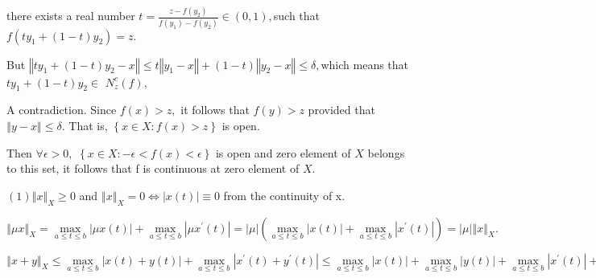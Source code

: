 \documentclass{article}
\begin{document}
there exists a real number $t=\frac{z-f\left( y_{2}\right) }{f\left(
y_{1}\right) -f\left( y_{2}\right) }\in \left( 0,1\right) ,$such that $%
f\left( ty_{1}+\left( 1-t\right) y_{2}\right) =z.$

But $\left\Vert ty_{1}+\left( 1-t\right) y_{2}-x\right\Vert \leq t\left\Vert
y_{1}-x\right\Vert +\left( 1-t\right) \left\Vert y_{2}-x\right\Vert \leq
\delta ,$which means that $ty_{1}+\left( 1-t\right) y_{2}\in $ $%
N_{z}^{c}\left( f\right) ,$

A contradiction. Since  $f\left( x\right) >z,$ it follows that $f\left(
y\right) >z$ provided that $\left\Vert y-x\right\Vert \leq \delta .$ That
is, $\left\{ x\in X:f\left( x\right) >z\right\} $ is open. 

Then $\forall \epsilon >0,$ $\left\{ x\in X:-\epsilon <f\left( x\right)
<\epsilon \right\} $ is open and zero element of $X$ belongs to this set, it
follows that  f is continuous at zero element of $X.$ 


$\left( 1\right) \left\Vert x\right\Vert _{X}\geq 0$ and $\left\Vert
x\right\Vert _{X}=0\iff \left\vert x\left( t\right) \right\vert \equiv 0$
from the continuity of x.

$\left\Vert \mu x\right\Vert _{X}=\underset{a\leq t\leq b}{\max }\left\vert
\mu x\left( t\right) \right\vert +\underset{a\leq t\leq b}{\max }\left\vert
\mu x^{\prime }\left( t\right) \right\vert =\left\vert \mu \right\vert
\left( \underset{a\leq t\leq b}{\max }\left\vert x\left( t\right)
\right\vert +\underset{a\leq t\leq b}{\max }\left\vert x^{\prime }\left(
t\right) \right\vert \right) =\left\vert \mu \right\vert \left\Vert
x\right\Vert _{X}.$

$\left\Vert x+y\right\Vert _{X}\leq \underset{a\leq t\leq b}{\max }%
\left\vert x\left( t\right) +y\left( t\right) \right\vert +\underset{a\leq
t\leq b}{\max }\left\vert x^{\prime }\left( t\right) +y^{\prime }\left(
t\right) \right\vert \leq \underset{a\leq t\leq b}{\max }\left\vert x\left(
t\right) \right\vert +\underset{a\leq t\leq b}{\max }\left\vert y\left(
t\right) \right\vert +\underset{a\leq t\leq b}{\max }\left\vert x^{\prime
}\left( t\right) \right\vert +\underset{a\leq t\leq b}{\max }\left\vert
y^{\prime }\left( t\right) \right\vert $
\end{document}
